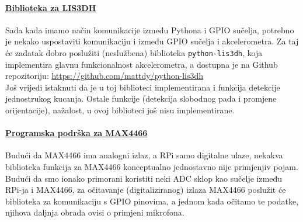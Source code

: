 \documentclass[12pt,a4paper]{article}
\begin{document}

\paragraph{\underline{Biblioteka za LIS3DH}} %
	\label{par:lis3dh_lib}
		Sada kada imamo način komunikacije između Pythona i GPIO sučelja, potrebno je nekako uspostaviti komunikaciju i između GPIO sučelja i akcelerometra. Za taj će zadatak dobro poslužiti (neslužbena) biblioteka \texttt{python-lis3dh}, koja implementira glavnu funkcionalnost akcelerometra, a dostupna je na Github repozitoriju: \url{https://github.com/mattdy/python-lis3dh} \\
		Još vrijedi istaknuti da je u toj biblioteci implementirana i funkcija detekcije jednostrukog kucanja. Ostale funkcije (detekcija slobodnog pada i promjene orijentacije), nažalost, u ovoj biblioteci još nisu implementirane.



\paragraph{\underline{Programska podrška za MAX4466}} %
	\label{par:max4466_lib}
		Budući da MAX4466 ima analogni izlaz, a RPi samo digitalne ulaze, nekakva biblioteka funkcija za MAX4466 konceptualno jednostavno nije primjenjiv pojam. Budući da smo ionako primorani koristiti neki ADC sklop kao sučelje između RPi-ja i MAX4466, za očitavanje (digitaliziranog) izlaza MAX4466 poslužit će biblioteka za komunikaciju s GPIO pinovima, a jednom kada očitamo te podatke, njihova daljnja obrada ovisi o primjeni mikrofona.



\newpage
\end{document}
